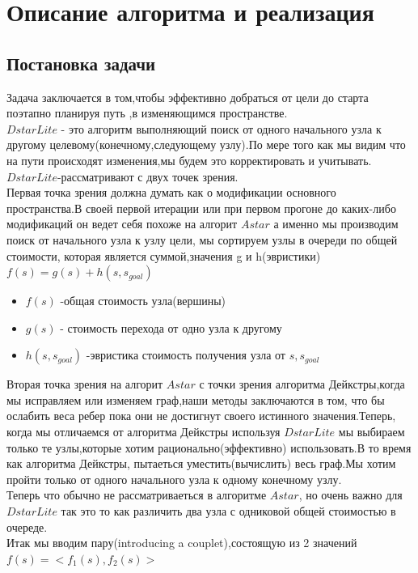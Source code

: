\documentclass[12pt]{article}
\begin{document}
\begin{center}
   \hypertarget{a3}{\section*{Описание алгоритма и реализация}} 
\end{center}
\hypertarget{b1}{\subsection*{Постановка задачи}}
Задача заключается в том,чтобы эффективно добраться от цели до старта поэтапно планируя путь ,в изменяющимся пространстве.\\
$D star Lite$ - это алгоритм выполняющий поиск от одного начального узла к другому целевому(конечному,следующему узлу).По мере того как мы видим что на пути происходят изменения,мы будем это корректировать и учитывать.$D star Lite$-рассматривают с двух точек зрения.\\
Первая точка зрения должна думать как о модификации основного пространства.В своей первой итерации или при первом прогоне до каких-либо модификаций он ведет себя похоже на алгорит $A star$ а именно мы производим поиск от начального узла к узлу цели, мы сортируем узлы в очереди по общей стоимости, которая является суммой,значения g и h(эвристики)$f(s)=g(s)+h(s,s_{goal})$
\begin{itemize}
    \item $f(s)$ -общая стоимость узла(вершины)
    \item $g(s)$ - стоимость перехода от одно узла к другому
    \item $h(s,s_{goal})$ -эвристика стоимость получения узла от $s,s_{goal}$
\end{itemize}
Вторая точка зрения на алгорит $A star$ с точки зрения алгоритма Дейкстры,когда мы исправляем или изменяем граф,наши методы заключаются в том, что бы ослабить веса ребер пока они не достигнут своего истинного значения.Теперь, когда мы отличаемся от алгоритма Дейкстры используя $D star Lite$ мы выбираем только те узлы,которые хотим рационально(эффективно) использовать.В то время как алгоритма Дейкстры, пытаеться уместить(вычислить) весь граф.Мы хотим пройти только от одного начального узла к одному конечному узлу.\\
Теперь что обычно не рассматриваеться в алгоритме $A star$, но очень важно для $D star Lite$ так это то как различить два узла с одниковой общей стоимостью в очереде.\\
Итак мы вводим пару(introducing a couplet),состоящую из 2 значений $f(s)=<f_1(s),f_2(s)>$
\end{document}
